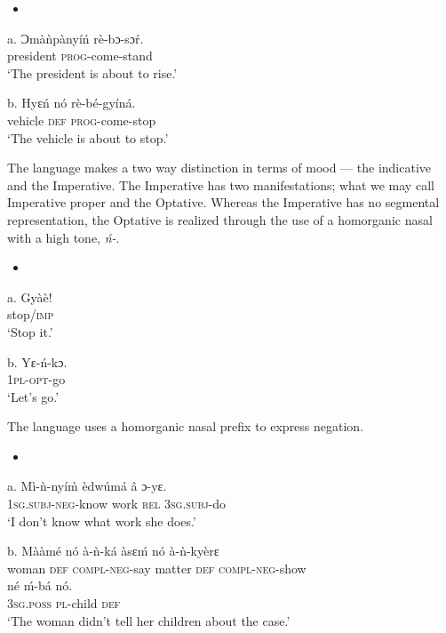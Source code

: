 \documentclass[output=paper]{langsci/langscibook}
\begin{document}
\begin{itemize}
\item \end{itemize}
\gll a.  Ɔm\`{a}\`{n}p\`{a}ny\'{i}\'{n}  r\`{e}-bɔ-sɔ\'{r}.\\
       president  \textsc{prog}{}-come-stand\\
\glt   ‘The president is about to rise.’
\z

\gll  b.  Hyɛ\'{n}    n\'{o}  r\`{e}-b\'{e}-gy\'{i}n\'{a}.\\
       vehicle    \textsc{def}  \textsc{prog}{}-come-stop\\
\glt   ‘The vehicle is about to stop.’
\z

The language makes a two way distinction in terms of mood — the indicative and the Imperative. The Imperative has two manifestations; what we may call Imperative proper and the Optative. Whereas the Imperative has no segmental representation, the Optative is realized through the use of a homorganic nasal with a high tone, \emph{\'{n}-}. 

\begin{itemize}
\item \end{itemize}
\gll a.  Gy\`{a}\`{e}!\\
       stop/\textsc{imp}\\
\glt   ‘Stop it.’
\z

\gll  b.  Yɛ-\'{n}-kɔ.\\
       \textsc{1pl}{}-\textsc{opt}{}-go\\
\glt   ‘Let’s go.’
\z

The language uses a homorganic nasal prefix to express negation.

\begin{itemize}
\item \end{itemize}
\gll a.  M\`{i}-\`{n}-ny\'{i}\`{m}     \`{e}dw\'{u}m\'{a}  â   ɔ{}-yɛ.\\
       \textsc{1sg.subj}{}-\textsc{neg}{}-know  work    \textsc{rel}  \textsc{3sg.subj}{}-do\\
\glt   ‘I don’t know what work she does.’
\z

\gll  b.  M\`{a}\`{a}m\'{e}    n\'{o}  \`{a}-\`{n}-k\'{a}       \`{a}sɛ\'{m}  n\'{o}  \`{a}-\`{n}-ky\`{e}rɛ\\
       woman    \textsc{def}  \textsc{compl}{}-\textsc{neg}{}-say  matter  \textsc{def  compl}{}-\textsc{neg}{}-show\\
\gll   n\'{e}    \'{m}-b\'{a}    n\'{o}.\\
       \textsc{3sg.poss}  \textsc{pl}{}-child  \textsc{def}\\
\glt   ‘The woman didn’t tell her children about the case.’  
\z
\end{document}
